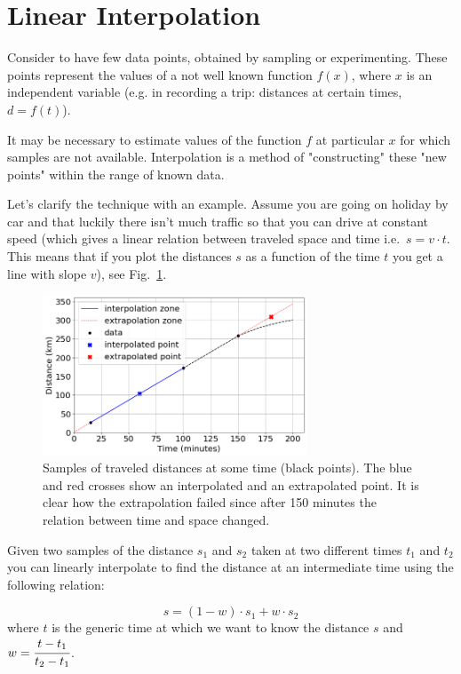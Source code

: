 \section{Linear Interpolation}
\label{linear-interpolation}

Consider to have few data points, obtained by sampling or experimenting. These points represent the values of a not well known function $f(x)$, where $x$ is an independent variable (e.g. in recording a trip: distances at certain times, $d = f(t)$).

It may be necessary to estimate values of the function $f$ at particular $x$ for which samples are not available. Interpolation is a method of "constructing" these "new points" within the range of known data.

Let's clarify the technique with an example.
Assume you are going on holiday by car and that luckily there isn't much traffic so that you can drive at constant speed (which gives a linear relation between traveled space and time i.e.~$s = v \cdot t$. This means that if you plot the distances $s$ as a function of the time $t$ you get a line with slope $v$), see Fig.~\ref{fig:samples_for_interpolation}.

\begin{figure}[hb]
  \centering
  \includegraphics[width=0.7\textwidth]{figures/interp_example1.png}
  \caption{Samples of traveled distances at some time (black points). The blue and red crosses show an interpolated and an extrapolated point. It is clear how the extrapolation failed since after 150 minutes the relation between time and space changed.}
  \label{fig:samples_for_interpolation}
\end{figure}

Given two samples of the distance $s_1$ and $s_2$ taken at two different times $t_1$ and $t_2$ you can linearly interpolate to find the distance at an intermediate time using the following relation:

\begin{equation}
s = (1 - w)\cdot s_1 + w \cdot s_2
\end{equation}
where $t$ is the generic time at which we want to know the distance $s$ and $w = \cfrac{t - t_1}{t_2 - t_1}$.

